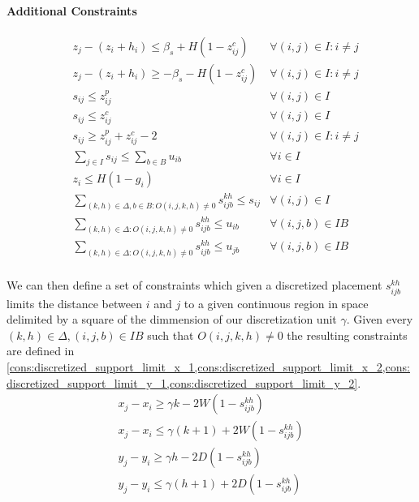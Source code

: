 \paragraph*{Additional Constraints}
\label{par:support_const}
\begin{align}
    & z_j - (z_i + h_i) \le \beta_s + H (1 - z^c_{ij}) & \forall (i, j) \in I : i \neq j \label{cons:z_close_1} \\
    & z_j - (z_i + h_i) \ge -\beta_s - H (1 - z^c_{ij}) & \forall (i, j) \in I : i \neq j \label{cons:z_close_2} \\
    & s_{ij} \le z^p_{ij} & \forall (i, j) \in I  \label{cons:supporting_1} \\
    & s_{ij} \le z^c_{ij} & \forall (i, j) \in I  \label{cons:supporting_2} \\
    & s_{ij} \ge z^p_{ij} + z^c_{ij} - 2 & \forall (i, j) \in I : i \neq j \label{cons:supporting} \\
    & \sum\limits_{j \in I}{s_{ij}} \le \sum\limits_{b \in B}{u_{ib}} & \forall i \in I  \label{cons:support_comes_from_placed} \\
    & z_i \le H(1 - g_i) & \forall i \in I \label{cons:grounded} \\
    & \sum\limits_{(k, h) \in \Delta, b \in B : O(i, j, k, h) \neq 0} s^{k h}_{i j b} \le s_{ij} & \forall (i, j) \in I \label{cons:discretized_support_same} \\
    & \sum\limits_{(k, h) \in \Delta : O(i, j, k, h) \neq 0} s^{k h}_{i j b} \le u_{ib} & \forall (i, j, b) \in IB \label{cons:discretized_support_right_bin_i} \\
    & \sum\limits_{(k, h) \in \Delta : O(i, j, k, h) \neq 0} s^{k h}_{i j b} \le u_{jb} & \forall (i, j, b) \in IB \label{cons:discretized_support_right_bin_j} \\
\end{align}

We can then define a set of constraints which given a discretized placement $s^{k h}_{i j b}$ limits the distance between $i$ and $j$ to a given continuous region in space delimited by a square of the dimmension of our discretization unit $\gamma$. 
Given every $ (k, h) \in \Delta, (i, j, b) \in IB$ such that $O(i, j, k, h) \neq 0$ the resulting constraints are defined in \cref{cons:discretized_support_limit_x_1,cons:discretized_support_limit_x_2,cons:discretized_support_limit_y_1,cons:discretized_support_limit_y_2}.
\begin{align}
    & x_j - x_i \ge \gamma k - 2W( 1 - s^{k h}_{i j b}) &  \label{cons:discretized_support_limit_x_1} \\
    & x_j - x_i \le \gamma (k + 1) + 2W( 1 - s^{k h}_{i j b}) &  \label{cons:discretized_support_limit_x_2} \\
    & y_j - y_i \ge \gamma h - 2D( 1 - s^{k h}_{i j b}) &  \label{cons:discretized_support_limit_y_1} \\
    & y_j - y_i \le \gamma (h + 1) + 2D( 1 - s^{k h}_{i j b}) &  \label{cons:discretized_support_limit_y_2}
\end{align}

